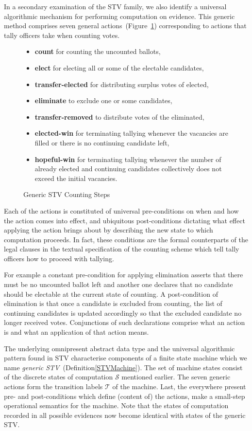 \documentclass[10pt,conference]{IEEEtran}
\newtheorem{remark}{Remark}
\begin{document}
In a secondary examination of the STV family, we also identify a universal algorithmic mechanism for performing computation on evidence. This generic method comprises seven general actions~(Figure~\ref{GenSteps}) corresponding to actions that tally officers take when counting votes.
\begin{figure} 
 \begin{itemize}
\item\textbf{count} for counting the uncounted ballots,
\item\textbf{elect} for electing all or some of the electable candidates, 
\item\textbf{transfer-elected} for distributing surplus votes of elected, %
\item\textbf{eliminate} to exclude one or some candidates, 
\item\textbf{transfer-removed} to distribute votes of   the eliminated, %
\item\textbf{elected-win} for terminating tallying whenever the vacancies are filled or there is no continuing candidate left, 
\item\textbf{hopeful-win} for terminating tallying whenever  the number of already elected and continuing candidates collectively does not exceed the initial vacancies. 
\end{itemize}
\caption{Generic STV Counting Steps}
\label{GenSteps}
\end{figure}
Each of the actions is constituted of  universal pre-conditions on when and how the action comes into effect, and ubiquitous post-conditions dictating what effect applying the action brings about by describing the new state to which computation proceeds. In fact, these conditions are the formal counterparts of the legal clauses in the textual specification of the counting scheme which tell tally officers how to proceed with tallying. 

For example a constant pre-condition for applying elimination  asserts that there must be no uncounted ballot left and another one declares that no candidate should be electable at the current state of counting. A post-condition of elimination is that once a candidate is excluded from counting, the list of continuing candidates is updated accordingly so that the excluded candidate no longer received votes. Conjunctions of such declarations comprise what an action is and what an application of that action means.


The underlying omnipresent abstract data type and the universal algorithmic pattern found in STV characterise components of a finite state machine which we name \emph{generic STV}~(Definition\ref{STVMachine}). The set of machine states consist of the discrete states of computation $\mathcal{S}$ mentioned earlier. The seven generic actions form the transition labels $\mathcal{T}$ of the machine. Last, the everywhere present pre- and post-conditions which define (content of)  the actions, make a small-step operational semantics for the machine.
Note that the states of computation recorded in all possible  evidences now become identical with states of the generic STV. 
\end{document}
